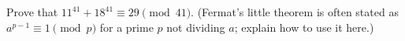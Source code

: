 Prove that $11^{41}+18^{41}\equiv29\pmod{41}$. (Fermat's little theorem is often stated as $a^{p-1}\equiv1\pmod p$ for a prime $p$ not dividing $a$; explain how to use it here.)
